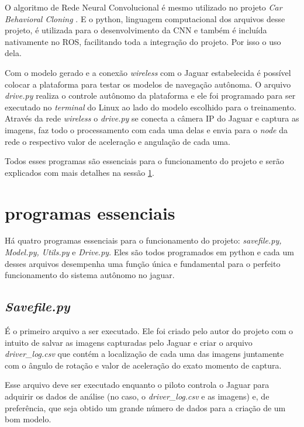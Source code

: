 O algoritmo de Rede Neural Convolucional é mesmo utilizado no projeto \textit{Car Behavioral Cloning} \cite{naokish}. E o python, linguagem computacional dos arquivos desse projeto, é utilizada para o desenvolvimento da CNN e também é incluída nativamente no ROS, facilitando toda a integração do projeto. Por isso o uso dela.

Com o modelo gerado e a conexão \textit{wireless} com o Jaguar estabelecida é possível colocar a plataforma para testar os modelos de navegação autônoma. O arquivo \textit{drive.py} realiza o controle autônomo da plataforma e ele foi programado para ser executado no \textit{terminal} do Linux ao lado do modelo escolhido para o treinamento. Através da rede \textit{wireless} o \textit{drive.py} se conecta a câmera IP do Jaguar e captura as imagens, faz todo o processamento com cada uma delas e envia para o \textit{node} da rede o respectivo valor de aceleração e angulação de cada uma. 

Todos esses programas são essenciais para o funcionamento do projeto e serão explicados com mais detalhes na sessão \ref{sec:programas essenciais}.


\section{programas essenciais}
\label{sec:programas essenciais}
Há quatro programas essenciais para o funcionamento do projeto: \textit{savefile.py, Model.py, Utils.py} e \textit{Drive.py}. Eles são todos programados em python e cada um desses arquivos desempenha uma função única e fundamental para o perfeito funcionamento do sistema autônomo no jaguar.

\subsection{\textit{Savefile.py}}
\label{sec:Savefile.py}

É o primeiro arquivo a ser executado. Ele foi criado pelo autor do projeto com o intuito de salvar as imagens capturadas pelo Jaguar e criar o arquivo \textit{driver\_log.csv} que contém a localização de cada uma das imagens juntamente com o ângulo de rotação e valor de aceleração do exato momento de captura. 

Esse arquivo deve ser executado enquanto o piloto controla o Jaguar para adquirir os dados de análise (no caso, o \textit{driver\_log.csv} e as imagens) e, de preferência, que seja obtido um grande número de dados para a criação de um bom modelo. 

